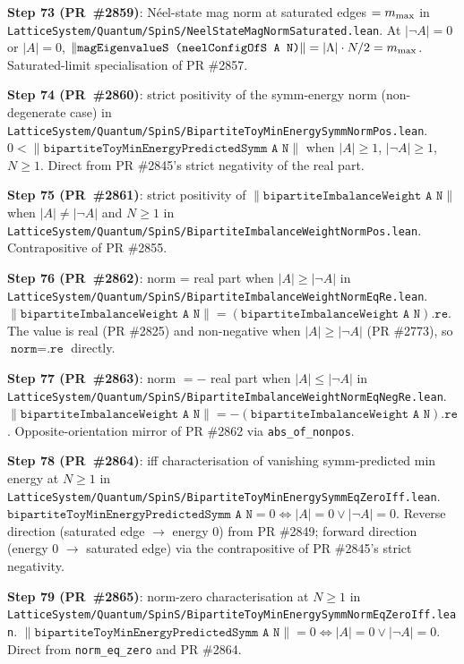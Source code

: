 \documentclass[a4paper,11pt]{article}
\begin{document}
\textbf{Step 73 (PR~\#2859)}: Néel-state mag norm at saturated
edges $= m_{\rm max}$ in
\texttt{LatticeSystem/Quantum/SpinS/NeelStateMagNormSaturated.lean}.
At $|\neg A| = 0$ or $|A| = 0$,
$\|\texttt{magEigenvalueS (neelConfigOfS A N)}\| = |\Lambda|
\cdot N / 2 = m_{\rm max}$. Saturated-limit specialisation of
PR \#2857.

\textbf{Step 74 (PR~\#2860)}: strict positivity of the symm-energy
norm (non-degenerate case) in
\texttt{LatticeSystem/Quantum/SpinS/BipartiteToyMinEnergySymmNormPos.lean}.
$0 < \|\texttt{bipartiteToyMinEnergyPredictedSymm A N}\|$ when
$|A| \ge 1$, $|\neg A| \ge 1$, $N \ge 1$. Direct from PR \#2845's
strict negativity of the real part.

\textbf{Step 75 (PR~\#2861)}: strict positivity of
$\|\texttt{bipartiteImbalanceWeight A N}\|$ when $|A| \ne |\neg A|$
and $N \ge 1$ in
\texttt{LatticeSystem/Quantum/SpinS/BipartiteImbalanceWeightNormPos.lean}.
Contrapositive of PR \#2855.

\textbf{Step 76 (PR~\#2862)}: norm = real part when $|A| \ge |\neg A|$
in
\texttt{LatticeSystem/Quantum/SpinS/BipartiteImbalanceWeightNormEqRe.lean}.
$\|\texttt{bipartiteImbalanceWeight A N}\| =
(\texttt{bipartiteImbalanceWeight A N}).\texttt{re}$. The value
is real (PR \#2825) and non-negative when $|A| \ge |\neg A|$ (PR
\#2773), so $\texttt{norm} = \texttt{.re}$ directly.

\textbf{Step 77 (PR~\#2863)}: norm $= -$ real part when
$|A| \le |\neg A|$ in
\texttt{LatticeSystem/Quantum/SpinS/BipartiteImbalanceWeightNormEqNegRe.lean}.
$\|\texttt{bipartiteImbalanceWeight A N}\| =
-(\texttt{bipartiteImbalanceWeight A N}).\texttt{re}$.
Opposite-orientation mirror of PR \#2862 via \texttt{abs\_of\_nonpos}.

\textbf{Step 78 (PR~\#2864)}: iff characterisation of vanishing
symm-predicted min energy at $N \ge 1$ in
\texttt{LatticeSystem/Quantum/SpinS/BipartiteToyMinEnergySymmEqZeroIff.lean}.
$\texttt{bipartiteToyMinEnergyPredictedSymm A N} = 0
\Leftrightarrow |A| = 0 \lor |\neg A| = 0$. Reverse direction
(saturated edge $\to$ energy 0) from PR \#2849; forward direction
(energy 0 $\to$ saturated edge) via the contrapositive of PR
\#2845's strict negativity.

\textbf{Step 79 (PR~\#2865)}: norm-zero characterisation at
$N \ge 1$ in
\texttt{LatticeSystem/Quantum/SpinS/BipartiteToyMinEnergySymmNormEqZeroIff.lean}.
$\|\texttt{bipartiteToyMinEnergyPredictedSymm A N}\| = 0
\Leftrightarrow |A| = 0 \lor |\neg A| = 0$. Direct from
\texttt{norm\_eq\_zero} and PR \#2864.
\end{document}
